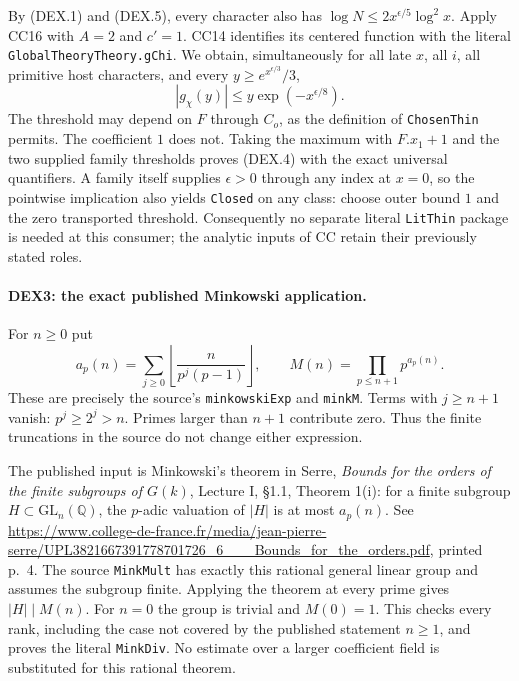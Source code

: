 By (DEX.1) and (DEX.5), every character also has
$\log N\le2x^{\epsilon/5}\log^2x$. Apply CC16 with $A=2$ and $c'=1$.
CC14 identifies its centered function with the literal
\texttt{GlobalTheoryTheory.gChi}. We obtain, simultaneously for all
late $x$, all $i$, all primitive host characters, and every
$y\ge e^{x^{\epsilon/3}}/3$,
\[
             |g_\chi(y)|\le y\exp(-x^{\epsilon/8}).        \tag{DEX.6}
\]
The threshold may depend on $F$ through $C_o$, as the definition of
\texttt{ChosenThin} permits. The coefficient $1$ does not. Taking the
maximum with $F.x_1+1$ and the two supplied family thresholds proves
(DEX.4) with the exact universal quantifiers. A family itself supplies
$\epsilon>0$ through any index at $x=0$, so the pointwise implication
also yields \texttt{Closed} on any class: choose outer bound $1$ and
the zero transported threshold. Consequently no separate literal
\texttt{LitThin} package is needed at this consumer; the analytic inputs
of CC retain their previously stated roles.

\paragraph{DEX3: the exact published Minkowski application.}
\label{claim:DEX3}
For $n\ge0$ put
\[
 a_p(n)=\sum_{j\ge0}\left\lfloor\frac{n}{p^j(p-1)}\right\rfloor,
 \qquad M(n)=\prod_{p\le n+1}p^{a_p(n)}.                  \tag{DEX.7}
\]
These are precisely the source's \texttt{minkowskiExp} and
\texttt{minkM}. Terms with $j\ge n+1$ vanish: $p^j\ge2^j>n$.
Primes larger than $n+1$ contribute zero. Thus the finite truncations
in the source do not change either expression.

The published input is Minkowski's theorem in Serre,
\emph{Bounds for the orders of the finite subgroups of $G(k)$},
Lecture I, \S1.1, Theorem 1(i): for a finite subgroup
$H\subset\mathrm{GL}_n(\mathbb Q)$, the $p$-adic valuation of $|H|$
is at most $a_p(n)$. See
\url{https://www.college-de-france.fr/media/jean-pierre-serre/UPL3821667391778701726_6___Bounds_for_the_orders.pdf},
printed p.~4. The source \texttt{MinkMult} has exactly this rational
general linear group and assumes the subgroup finite. Applying the
theorem at every prime gives $|H|\mid M(n)$. For $n=0$ the group is
trivial and $M(0)=1$. This checks every rank, including the case not
covered by the published statement $n\ge1$, and proves the literal
\texttt{MinkDiv}. No estimate over a larger coefficient field is
substituted for this rational theorem.

